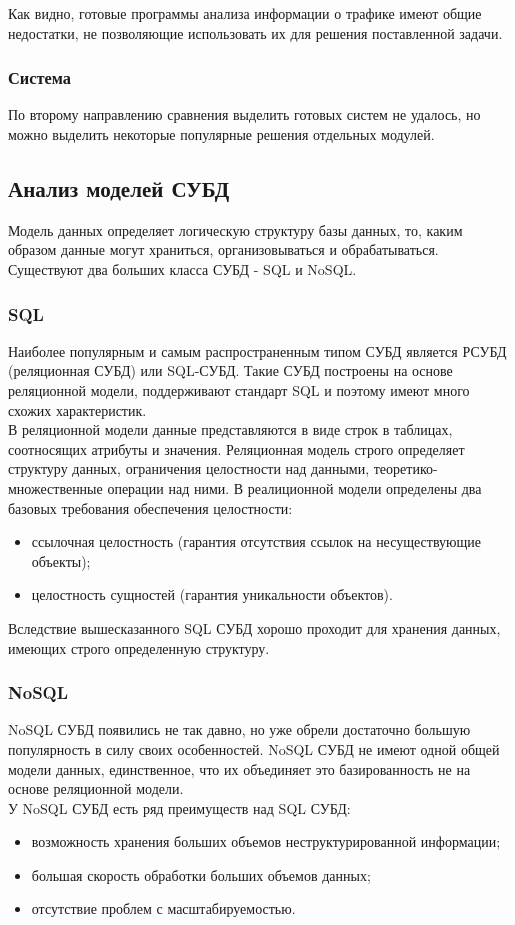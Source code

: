 Как видно, готовые программы анализа информации о трафике имеют общие недостатки, не позволяющие использовать их для решения поставленной задачи.
\subsubsection{ Система }
По второму направлению сравнения выделить готовых систем не удалось, но можно выделить некоторые популярные решения отдельных модулей.

\subsection{Анализ моделей СУБД}
Модель данных определяет логическую структуру базы данных, то, каким образом данные могут храниться, организовываться и обрабатываться. Существуют два больших класса СУБД - SQL и NoSQL.

\subsubsection{SQL}
Наиболее популярным и самым распространенным типом СУБД является РСУБД (реляционная СУБД) или SQL-СУБД. Такие СУБД построены на основе реляционной модели, поддерживают стандарт SQL и поэтому имеют много схожих характеристик. \\
\indent В реляционной модели данные представляются в виде строк в таблицах, соотносящих атрибуты и значения. Реляционная модель строго определяет структуру данных, ограничения целостности над данными, теоретико-множественные операции над ними. В реалиционной модели определены два базовых требования обеспечения целостности:
\begin{itemize}
 \item ссылочная целостность (гарантия отсутствия ссылок на несуществующие объекты);
 \item целостность сущностей (гарантия уникальности объектов).
\end{itemize}
\indent \indent Вследствие вышесказанного SQL СУБД хорошо проходит для хранения данных, имеющих строго определенную структуру.

\subsubsection{NoSQL}
NoSQL СУБД появились не так давно, но уже обрели достаточно большую популярность в силу своих особенностей. NoSQL СУБД не имеют одной общей модели данных, единственное, что их объединяет это базированность не на основе реляционной модели. \\
\indent У NoSQL СУБД есть ряд преимуществ над SQL СУБД:
\begin{itemize}
 \item возможность хранения больших объемов неструктурированной информации;
 \item большая скорость обработки больших объемов данных;
 \item отсутствие проблем с масштабируемостью.
\end{itemize}

